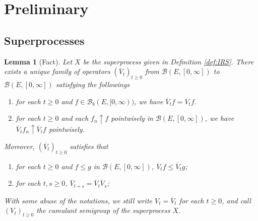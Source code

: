 \documentclass[12pt,a4paper]{amsart}
\numberwithin{equation}{section}
\theoremstyle{plain}
\newtheorem{lem}[thm]{Lemma}
\theoremstyle{definition}
\begin{document}
\section{Preliminary}
\subsection{Superprocesses}
\label{sec:PS}
  \begin{lem}[Fact]
    \label{lem:PSC}
    Let $X$ be the superprocess given in Definition \ref{def:IRS}.
    There exists a unique family of operators $(\overline V_t)_{t \geq 0}$ from $\mathcal B(E, [0,\infty])$ to $\mathcal B(E, [0,\infty])$ satisfying the followings
    \begin{enumerate}[label=(\alph*)]
    \item
      \label{lem:PSCa}
      for each $t\geq 0$ and $f \in \mathcal B_b(E, [0,\infty))$, we have $\overline V_tf = V_tf$.
    \item
      \label{lem:PSCb}
      for each $t\geq 0$ and each $f_n \uparrow f$ pointwisely in $\mathcal B(E, [0,\infty])$, we have $\overline V_tf_n \uparrow \overline V_tf$ pointwisely.
    \end{enumerate}
    Moreover, $(\overline V_t)_{t\geq 0}$ satisfies that
    \begin{enumerate}
    \item
      \label{lem:PSC1}
      for each $t\geq 0$ and $f\leq g$ in $\mathcal B(E,[0,\infty])$, $\overline V_tf \leq \overline V_tg$;
    \item
      \label{lem:PSC2}
      for each $t, s\geq 0$, $\overline V_{t+s} = \overline V_t \overline V_s$;
    \end{enumerate}
    With some abuse of the notations, we still write $V_t = \overline V_t$ for each $t\geq 0$, and call $(V_t)_{t\geq 0}$ the \emph{cumulant semigroup} of the superprocess $X$.
  \end{lem}
\end{document}
